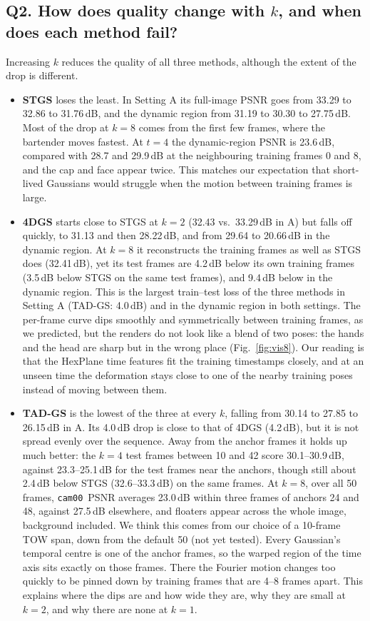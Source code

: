 \documentclass[10pt,a4paper]{article}
\newcommand{\camz}{\texttt{cam00}}
\begin{document}
\subsection*{Q2. How does quality change with $k$, and when does each method fail?}
Increasing $k$ reduces the quality of all three methods, although the extent of the drop is different.
\begin{itemize}
\item \textbf{STGS} loses the least. In Setting A its full-image PSNR goes from 33.29 to 32.86 to 31.76\,dB, and the dynamic region from 31.19 to 30.30 to 27.75\,dB. Most of the drop at $k=8$ comes from the first few frames, where the bartender moves fastest. At $t=4$ the dynamic-region PSNR is 23.6\,dB, compared with 28.7 and 29.9\,dB at the neighbouring training frames 0 and 8, and the cap and face appear twice. This matches our expectation that short-lived Gaussians would struggle when the motion between training frames is large.
\item \textbf{4DGS} starts close to STGS at $k=2$ (32.43 vs.\ 33.29\,dB in A) but falls off quickly, to 31.13 and then 28.22\,dB, and from 29.64 to 20.66\,dB in the dynamic region. At $k=8$ it reconstructs the training frames as well as STGS does (32.41\,dB), yet its test frames are 4.2\,dB below its own training frames (3.5\,dB below STGS on the same test frames), and 9.4\,dB below in the dynamic region. This is the largest train--test loss of the three methods in Setting A (TAD-GS: 4.0\,dB) and in the dynamic region in both settings. The per-frame curve dips smoothly and symmetrically between training frames, as we predicted, but the renders do not look like a blend of two poses: the hands and the head are sharp but in the wrong place (Fig.~\ref{fig:vis8}). Our reading is that the HexPlane time features fit the training timestamps closely, and at an unseen time the deformation stays close to one of the nearby training poses instead of moving between them.
\item \textbf{TAD-GS} is the lowest of the three at every $k$, falling from 30.14 to 27.85 to 26.15\,dB in A. Its 4.0\,dB drop is close to that of 4DGS (4.2\,dB), but it is not spread evenly over the sequence. Away from the anchor frames it holds up much better: the $k=4$ test frames between 10 and 42 score 30.1--30.9\,dB, against 23.3--25.1\,dB for the test frames near the anchors, though still about 2.4\,dB below STGS (32.6--33.3\,dB) on the same frames. At $k=8$, over all 50 frames, \camz\ PSNR averages 23.0\,dB within three frames of anchors 24 and 48, against 27.5\,dB elsewhere, and floaters appear across the whole image, background included. We think this comes from our choice of a 10-frame TOW span, down from the default 50 (not yet tested). Every Gaussian's temporal centre is one of the anchor frames, so the warped region of the time axis sits exactly on those frames. There the Fourier motion changes too quickly to be pinned down by training frames that are 4--8 frames apart. This explains where the dips are and how wide they are, why they are small at $k=2$, and why there are none at $k=1$.
\end{itemize}
\end{document}
